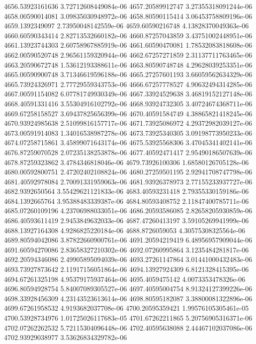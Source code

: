 {4656.53923161636 3.72712608449084e-06
4657.20589912747 3.27355318091244e-06
4658.00590014081 3.09835030948972e-06
4658.80590115414 3.06453758809196e-06
4659.1392349097 2.73950048142559e-06
4659.60590216748 4.13828370049363e-06
4660.60590343414 2.82713532660182e-06
4660.87257043859 3.43751002448951e-06
4661.13923744303 2.60758967885919e-06
4661.60590470081 1.78532083818608e-06
4662.00590520748 2.96561159320944e-06
4662.67257271859 2.31137711763465e-06
4663.20590672748 1.53612193388611e-06
4663.80590748748 4.29628039253351e-06
4665.00590900748 3.71346619596188e-06
4665.27257601193 3.66059562634329e-06
4665.73924326971 2.77729559343753e-06
4666.67257778527 4.90632494314285e-06
4667.00591154082 6.07781749930349e-06
4667.33924529638 3.46819152127148e-06
4668.40591331416 3.55304916102792e-06
4668.93924732305 3.40724674368711e-06
4669.67258158527 3.69437825656399e-06
4670.40591584749 4.38865821418245e-06
4670.93924985638 2.51099816157717e-06
4671.73925086972 4.29372982039127e-06
4673.00591914083 1.34016538987278e-06
4673.73925340305 3.09198773950233e-06
4674.07258715861 3.45899071643174e-06
4675.53925568306 3.47045341402141e-06
4676.87259070528 2.07235138253878e-06
4677.40592471417 2.95490186507639e-06
4678.87259323862 3.4784346818046e-06
4679.73926100306 1.68580126705128e-06
4680.00592800751 2.47202402108824e-06
4680.27259501195 2.92941708747798e-06
4681.40592978084 2.70091331959063e-06
4681.93926378973 2.77155233937727e-06
4682.9392650564 3.55429621121833e-06
4683.40593231418 2.79355330159186e-06
4684.1392665764 3.95388483339387e-06
4684.80593408752 2.11847400785711e-06
4685.07260109196 4.23706988033051e-06
4686.20593586085 2.82658205930859e-06
4686.40593611419 2.9453849632033e-06
4687.47260413197 3.59105269941999e-06
4688.13927164308 4.9286825220184e-06
4688.8726059053 4.30575308325564e-06
4689.80594042086 3.87822660900761e-06
4691.20594219419 6.48956957909044e-06
4691.60594270086 2.83658327210302e-06
4692.07260995864 3.1235484281817e-06
4692.20594346086 2.49905895094039e-06
4693.27261147864 3.01441000432483e-06
4693.73927873642 2.11917156051864e-06
4694.13927924309 6.8121328415395e-06
4694.67261325198 4.95379175937464e-06
4695.4059475142 4.0073353478326e-06
4696.80594928754 5.84007089305527e-06
4697.40595004754 8.91324127399226e-06
4698.33928456309 4.23143523613614e-06
4698.80595182087 3.38800081322896e-06
4699.67261958532 4.9193682037708e-06
4700.20595359421 1.99576105305461e-05
4700.53928734976 1.01725026117683e-05
4701.67262211865 5.20756905316371e-06
4702.07262262532 5.72115304096448e-06
4702.40595638088 2.44467102037086e-06
4702.93929038977 3.53626834329782e-06
}
